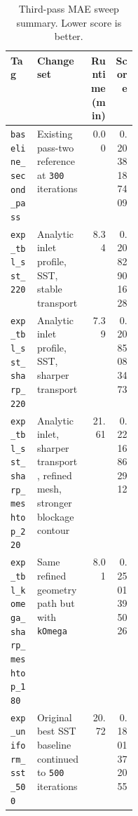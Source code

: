 \documentclass[11pt]{article}
\begin{document}
\begin{table}[H]
\centering
\small
\begin{tabularx}{0.98\linewidth}{>{\raggedright\arraybackslash}p{0.21\linewidth} >{\raggedright\arraybackslash}X r r}
\toprule
Tag & Change set & Runtime (min) & Score \\
\midrule
\texttt{baseline\_second\_pass} & Existing pass-two reference at \texttt{300} iterations & 0.00 & 0.2038187409 \\
\texttt{exp\_tbl\_sst\_220} & Analytic inlet profile, SST, stable transport & 8.34 & 0.2082901628 \\
\texttt{exp\_tbl\_sst\_sharp\_220} & Analytic inlet profile, SST, sharper transport & 7.39 & 0.2085083473 \\
\texttt{exp\_tbl\_sst\_sharp\_meshtop\_220} & Analytic inlet, sharper transport, refined mesh, stronger blockage contour & 21.61 & 0.2216862912 \\
\texttt{exp\_tbl\_komega\_sharp\_meshtop\_180} & Same refined geometry path but with \texttt{kOmega} & 8.01 & 0.2501395026 \\
\texttt{exp\_uniform\_sst\_500} & Original best SST baseline continued to \texttt{500} iterations & 20.72 & 0.1801372055 \\
\bottomrule
\end{tabularx}
\normalsize
\caption{Third-pass MAE sweep summary. Lower score is better.}
\end{table}
\end{document}
